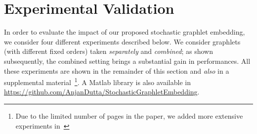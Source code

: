 \documentclass[journal]{IEEEtran}
\theoremstyle{definition}
\begin{document}
\section{Experimental Validation}
\label{sec:results}
In order to evaluate the impact of our proposed stochastic graphlet embedding, we consider four different experiments described below. We consider graphlets (with different fixed orders) taken {\it separately} and {\it combined}; as shown subsequently, the combined setting brings a substantial gain in performances. All these experiments are shown in the remainder of this section and {\it also} in a supplemental material~\cite{Dutta2018SGEsupp}\footnote{Due to the limited number of pages in the paper, we added more extensive experiments in~\cite{Dutta2018SGEsupp}}. A Matlab library is also available in \url{https://github.com/AnjanDutta/StochasticGraphletEmbedding}.

\begin{table}[!htbp]
\begin{center}
\caption{Some details on MUTAG, PTC, ENZYMES, D\&D, NCI1 and NCI109 graph datasets.}
\label{tab:det-graph-datasets1}
\end{center}
\end{table}
\end{document}
